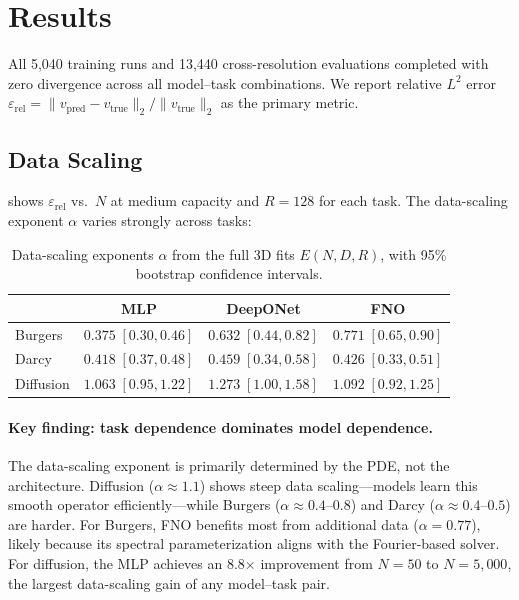 \documentclass[11pt]{article}
\newcommand{\relLtwo}{\varepsilon_{\mathrm{rel}}}
\begin{document}
\section{Results}
\label{sec:results}

All 5{,}040 training runs and 13{,}440 cross-resolution evaluations
completed with zero divergence across all model--task combinations.
We report relative $L^2$ error
$\relLtwo = \|v_{\mathrm{pred}} - v_{\mathrm{true}}\|_2 /
             \|v_{\mathrm{true}}\|_2$
as the primary metric.

\subsection{Data Scaling}
\label{sec:data-scaling}

 shows $\relLtwo$ vs.\ $N$ at medium capacity
and $R = 128$ for each task. The data-scaling exponent $\alpha$ varies
strongly across tasks:

\begin{table}[h]
\centering
\caption{Data-scaling exponents $\alpha$ from the full 3D fits
$E(N,D,R)$, with 95\% bootstrap confidence intervals.}
\label{tab:alpha}
\begin{tabular}{@{}lccc@{}}
\toprule
& \textbf{MLP} & \textbf{DeepONet} & \textbf{FNO} \\
\midrule
Burgers & $0.375\;[0.30, 0.46]$ & $0.632\;[0.44, 0.82]$
        & $0.771\;[0.65, 0.90]$ \\
Darcy   & $0.418\;[0.37, 0.48]$ & $0.459\;[0.34, 0.58]$
        & $0.426\;[0.33, 0.51]$ \\
Diffusion & $1.063\;[0.95, 1.22]$ & $1.273\;[1.00, 1.58]$
          & $1.092\;[0.92, 1.25]$ \\
\bottomrule
\end{tabular}
\end{table}

\paragraph{Key finding: task dependence dominates model dependence.}
The data-scaling exponent is primarily determined by the PDE, not the
architecture. Diffusion ($\alpha \approx 1.1$) shows steep data
scaling---models learn this smooth operator efficiently---while Burgers
($\alpha \approx 0.4$--$0.8$) and Darcy ($\alpha \approx 0.4$--$0.5$)
are harder. For Burgers, FNO benefits most from additional data
($\alpha = 0.77$), likely because its spectral parameterization aligns
with the Fourier-based solver. For diffusion, the MLP achieves an 8.8$\times$
improvement from $N = 50$ to $N = 5{,}000$, the largest data-scaling
gain of any model--task pair.
\end{document}
